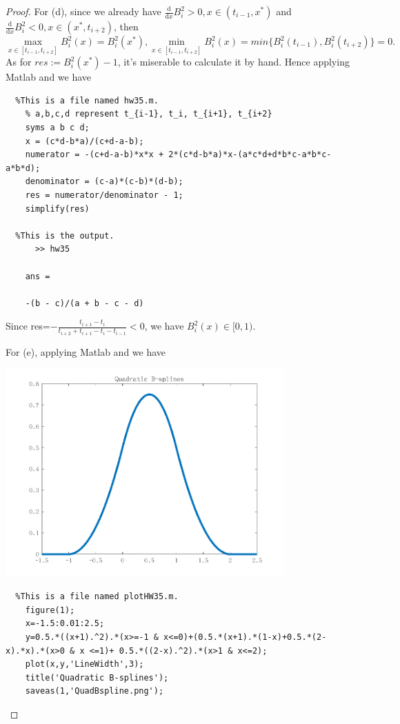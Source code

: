 \documentclass{article}
\newcommand{\dif}{\mathrm{d}}
\newcommand{\difFrac}[2]{\frac{\dif #1}{\dif #2}}
\begin{document}
\begin{proof}
   For (d), since we already have $\difFrac{}{x}B_i^2>0,x \in(t_{i-1},x^*)$ and $\difFrac{}{x}B_i^2<0,x \in(x^*,t_{i+2})$, then 
  \[
    \max_{x \in [t_{i-1},t_{i+2}]} B_i^2(x) = B_i^2(x^*), \min_{x \in [t_{i-1},t_{i+2}]} B_i^2(x) = min\{B_i^2(t_{i-1}),B_i^2(t_{i+2})\}=0.
  \]
  As for $res:=B_i^2(x^*)-1$, it's miserable to calculate it by hand. Hence applying Matlab and we have
  \lstset{language=Matlab}
  \begin{lstlisting}
  %This is a file named hw35.m.
    % a,b,c,d represent t_{i-1}, t_i, t_{i+1}, t_{i+2}
    syms a b c d;
    x = (c*d-b*a)/(c+d-a-b);
    numerator = -(c+d-a-b)*x*x + 2*(c*d-b*a)*x-(a*c*d+d*b*c-a*b*c-a*b*d);
    denominator = (c-a)*(c-b)*(d-b);
    res = numerator/denominator - 1;
    simplify(res)
  
  %This is the output.
      >> hw35
    
    ans =
    
    -(b - c)/(a + b - c - d)
  \end{lstlisting}
  Since res=$-\frac{t_{i+1}-t_i}{t_{i+2}+t_{i+1}-t_{i}-t_{i-1}}<0$, we have $B_i^2(x)\in[0,1)$.

  For (e), applying Matlab and we have 

  \includegraphics[width=0.8\textwidth]{QuadBspline.png}

  \lstset{language=Matlab}
  \begin{lstlisting}
  %This is a file named plotHW35.m.
    figure(1);
    x=-1.5:0.01:2.5;
    y=0.5.*((x+1).^2).*(x>=-1 & x<=0)+(0.5.*(x+1).*(1-x)+0.5.*(2-x).*x).*(x>0 & x <=1)+ 0.5.*((2-x).^2).*(x>1 & x<=2);
    plot(x,y,'LineWidth',3);
    title('Quadratic B-splines');
    saveas(1,'QuadBspline.png');
  \end{lstlisting}
\end{proof}
\end{document}
